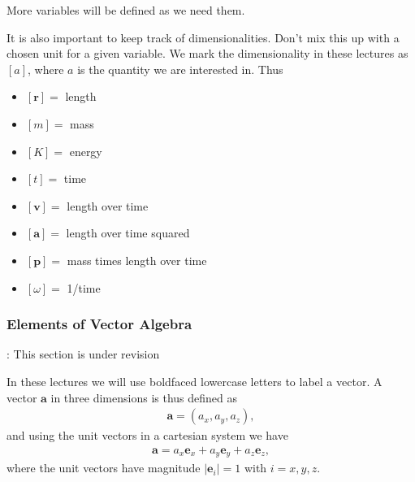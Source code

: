 \documentclass[letterpaper,10pt,english]{sphinxmanual}
\begin{document}
More variables will be defined as we need them.

It is also important to keep track of dimensionalities. Don’t mix this up with a chosen unit for a given variable. We mark the dimensionality in these lectures as \([a]\), where \(a\) is the quantity we are interested in. Thus
\begin{itemize}
\item {} 
\([\boldsymbol{r}]=\) length

\item {} 
\([m]=\) mass

\item {} 
\([K]=\) energy

\item {} 
\([t]=\) time

\item {} 
\([\boldsymbol{v}]=\) length over time

\item {} 
\([\boldsymbol{a}]=\) length over time squared

\item {} 
\([\boldsymbol{p}]=\) mass times length over time

\item {} 
\([\omega]=\) 1/time

\end{itemize}


\subsubsection{Elements of Vector Algebra}
\label{\detokenize{chapter2:elements-of-vector-algebra}}
: This section is under revision

In these lectures we will use boldfaced lower\sphinxhyphen{}case letters to label a vector. A vector \(\boldsymbol{a}\) in three dimensions is thus defined as
\begin{equation*}
\begin{split}
\boldsymbol{a} =(a_x,a_y, a_z),
\end{split}
\end{equation*}
and using the unit vectors in a cartesian system we have
\begin{equation*}
\begin{split}
\boldsymbol{a} = a_x\boldsymbol{e}_x+a_y\boldsymbol{e}_y+a_z\boldsymbol{e}_z,
\end{split}
\end{equation*}
where the unit vectors have magnitude \(\vert\boldsymbol{e}_i\vert = 1\) with \(i=x,y,z\).
\end{document}
